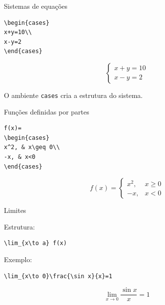 \documentclass[aspectratio=169,xcolor=dvipsnames]{beamer}
\begin{document}
\begin{frame}[fragile]{Sistemas de equações}

\begin{lstlisting}
\begin{cases}
x+y=10\\
x-y=2
\end{cases}
\end{lstlisting}

    \[
        \begin{cases}
            x+y=10\\
            x-y=2
        \end{cases}
    \]

    \begin{center}
        O ambiente \texttt{cases} cria a estrutura do sistema.
    \end{center}

\end{frame}

\begin{frame}[fragile]{Funções definidas por partes}

\begin{lstlisting}
f(x)=
\begin{cases}
x^2, & x\geq 0\\
-x, & x<0
\end{cases}
\end{lstlisting}

    \[
        f(x)=
        \begin{cases}
            x^2, & x\geq0\\
            -x, & x<0
        \end{cases}
    \]

\end{frame}




\begin{frame}[fragile]{Limites}

    Estrutura:

\begin{lstlisting}
\lim_{x\to a} f(x)
\end{lstlisting}

    Exemplo:

\begin{lstlisting}
\lim_{x\to 0}\frac{\sin x}{x}=1
\end{lstlisting}

    \[
        \lim_{x\to 0}
        \frac{\sin x}{x}
        =1
    \]

\end{frame}
\end{document}
